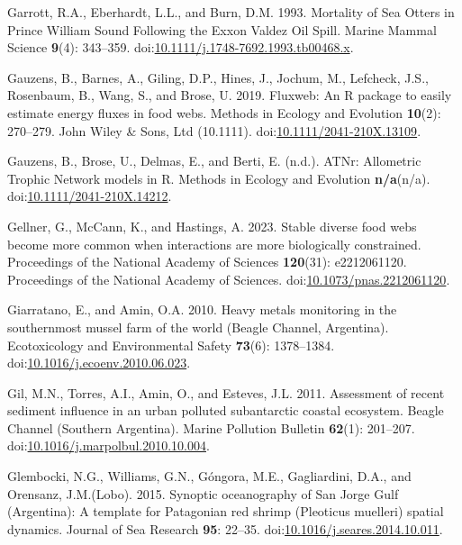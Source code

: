 \documentclass[
]{article}
\newlength{\cslhangindent}
\newenvironment{CSLReferences}[2] %
 {\begin{list}{}{%
  \setlength{\itemindent}{0pt}
  \setlength{\leftmargin}{0pt}
  \setlength{\parsep}{0pt}
  \ifodd #1
   \setlength{\leftmargin}{\cslhangindent}
   \setlength{\itemindent}{-1\cslhangindent}
  \fi
  \setlength{\itemsep}{#2\baselineskip}}}
 {\end{list}}
\begin{document}
\begin{CSLReferences}{1}{0}
Garrott, R.A., Eberhardt, L.L., and Burn, D.M. 1993. Mortality of {Sea
Otters} in {Prince William Sound Following} the {Exxon Valdez Oil
Spill}. Marine Mammal Science \textbf{9}(4): 343--359.
doi:\href{https://doi.org/10.1111/j.1748-7692.1993.tb00468.x}{10.1111/j.1748-7692.1993.tb00468.x}.

Gauzens, B., Barnes, A., Giling, D.P., Hines, J., Jochum, M., Lefcheck,
J.S., Rosenbaum, B., Wang, S., and Brose, U. 2019. Fluxweb: {An R}
package to easily estimate energy fluxes in food webs. Methods in
Ecology and Evolution \textbf{10}(2): 270--279. John Wiley \& Sons, Ltd
(10.1111).
doi:\href{https://doi.org/10.1111/2041-210X.13109}{10.1111/2041-210X.13109}.

Gauzens, B., Brose, U., Delmas, E., and Berti, E. (n.d.). {ATNr}:
{Allometric Trophic Network} models in {R}. Methods in Ecology and
Evolution \textbf{n/a}(n/a).
doi:\href{https://doi.org/10.1111/2041-210X.14212}{10.1111/2041-210X.14212}.

Gellner, G., McCann, K., and Hastings, A. 2023. Stable diverse food webs
become more common when interactions are more biologically constrained.
Proceedings of the National Academy of Sciences \textbf{120}(31):
e2212061120. Proceedings of the National Academy of Sciences.
doi:\href{https://doi.org/10.1073/pnas.2212061120}{10.1073/pnas.2212061120}.

Giarratano, E., and Amin, O.A. 2010. Heavy metals monitoring in the
southernmost mussel farm of the world ({Beagle Channel}, {Argentina}).
Ecotoxicology and Environmental Safety \textbf{73}(6): 1378--1384.
doi:\href{https://doi.org/10.1016/j.ecoenv.2010.06.023}{10.1016/j.ecoenv.2010.06.023}.

Gil, M.N., Torres, A.I., Amin, O., and Esteves, J.L. 2011. Assessment of
recent sediment influence in an urban polluted subantarctic coastal
ecosystem. {Beagle Channel} ({Southern Argentina}). Marine Pollution
Bulletin \textbf{62}(1): 201--207.
doi:\href{https://doi.org/10.1016/j.marpolbul.2010.10.004}{10.1016/j.marpolbul.2010.10.004}.

Glembocki, N.G., Williams, G.N., Góngora, M.E., Gagliardini, D.A., and
Orensanz, J.M.(Lobo). 2015. Synoptic oceanography of {San Jorge Gulf}
({Argentina}): {A} template for {Patagonian} red shrimp ({Pleoticus}
muelleri) spatial dynamics. Journal of Sea Research \textbf{95}: 22--35.
doi:\href{https://doi.org/10.1016/j.seares.2014.10.011}{10.1016/j.seares.2014.10.011}.


\end{CSLReferences}
\end{document}
